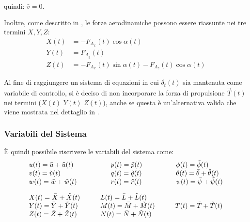\begin{sitemize}
    \item quindi: $\bar{v} = 0$.
\end{sitemize}

Inoltre, come descritto in \cite{bryson_control_spacecraft_aircraft}, le forze aerodinamiche possono essere riassunte nei tre termini $X, Y, Z$:
\begin{equation*}
    \begin{split}
        X(t) & = -F_{A_{x}}(t)\cos\alpha(t)                         \\
        Y(t) & = F_{A_y}(t)                                         \\
        Z(t) & = -F_{A_x}(t)\sin\alpha(t) - F_{A_z}(t)\cos\alpha(t)
    \end{split}
\end{equation*}

\begin{note}
    Al fine di raggiungere un sistema di equazioni in cui $\delta_t(t)$ sia mantenuta come variabile di controllo, si è deciso di non incorporare la forza di propulsione $\vec{T}(t)$ nei termini ($X(t)$ $Y(t)$ $Z(t)$), anche se questa è un'alternativa valida che viene mostrata nel dettaglio in \cite{smith_aircraft_flight_mechanics}.
\end{note}

\subsubsection{Variabili del Sistema}

È quindi possibile riscrivere le variabili del sistema come:
\begin{equation*}
    \setlength{\arraycolsep}{2.5em}
    \begin{array}{lll}
        u(t) = \bar{u} + \tilde{u}(t) & p(t) = \tilde{p}(t) & \phi(t) = \tilde{\phi}(t)                    \\
        v(t) = \tilde{v}(t)           & q(t) = \tilde{q}(t) & \theta(t) = \bar{\theta} + \tilde{\theta}(t) \\
        w(t) = \bar{w} + \tilde{w}(t) & r(t) = \tilde{r}(t) & \psi(t) = \bar{\psi} + \tilde{\psi}(t)       \\
    \end{array}
\end{equation*}

\begin{equation*}
    \setlength{\arraycolsep}{1.5em}
    \begin{array}{lll}
        X(t) = \bar{X} + \tilde{X}(t) & L(t) = \bar{L} + \tilde{L}(t) &                               \\
        Y(t) = \bar{Y} + \tilde{Y}(t) & M(t) = \bar{M} + \tilde{M}(t) & T(t) = \bar{T} + \tilde{T}(t) \\
        Z(t) = \bar{Z} + \tilde{Z}(t) & N(t) = \bar{N} + \tilde{N}(t) &                               \\
    \end{array}
\end{equation*}

